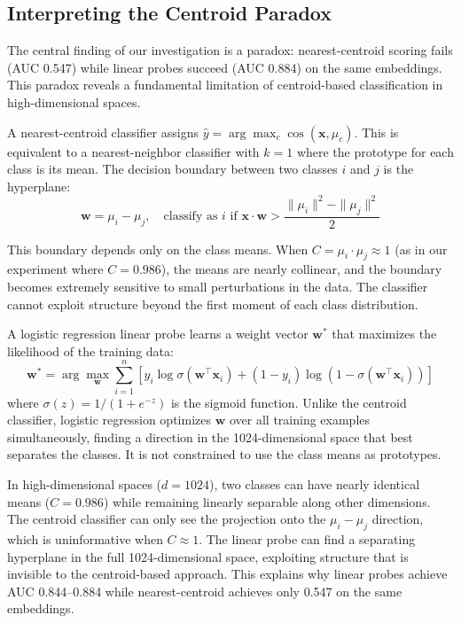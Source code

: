 \documentclass[12pt,a4paper]{article}
\begin{document}
\subsection{Interpreting the Centroid Paradox}\label{sec:paradox}

The central finding of our investigation is a paradox: nearest-centroid scoring fails (AUC 0.547) while linear probes succeed (AUC 0.884) on the same embeddings. This paradox reveals a fundamental limitation of centroid-based classification in high-dimensional spaces.

A nearest-centroid classifier assigns $\hat{y} = \arg\max_c \cos(\mathbf{x}, \mu_c)$. This is equivalent to a nearest-neighbor classifier with $k=1$ where the prototype for each class is its mean. The decision boundary between two classes $i$ and $j$ is the hyperplane:
\begin{equation}
\mathbf{w} = \mu_i - \mu_j, \quad \text{classify as } i \text{ if } \mathbf{x} \cdot \mathbf{w} > \frac{\|\mu_i\|^2 - \|\mu_j\|^2}{2}
\label{eq:centroid_boundary}
\end{equation}

This boundary depends only on the class means. When $C = \mu_i \cdot \mu_j \approx 1$ (as in our experiment where $C = 0.986$), the means are nearly collinear, and the boundary becomes extremely sensitive to small perturbations in the data. The classifier cannot exploit structure beyond the first moment of each class distribution.

A logistic regression linear probe learns a weight vector $\mathbf{w}^*$ that maximizes the likelihood of the training data:
\begin{equation}
\mathbf{w}^* = \arg\max_{\mathbf{w}} \sum_{i=1}^{n} \left[ y_i \log \sigma(\mathbf{w}^\top \mathbf{x}_i) + (1-y_i) \log(1 - \sigma(\mathbf{w}^\top \mathbf{x}_i)) \right]
\label{eq:logreg}
\end{equation}
where $\sigma(z) = 1/(1+e^{-z})$ is the sigmoid function. Unlike the centroid classifier, logistic regression optimizes $\mathbf{w}$ over all training examples simultaneously, finding a direction in the 1024-dimensional space that best separates the classes. It is not constrained to use the class means as prototypes.

In high-dimensional spaces ($d = 1024$), two classes can have nearly identical means ($C = 0.986$) while remaining linearly separable along other dimensions. The centroid classifier can only see the projection onto the $\mu_i - \mu_j$ direction, which is uninformative when $C \approx 1$. The linear probe can find a separating hyperplane in the full 1024-dimensional space, exploiting structure that is invisible to the centroid-based approach. This explains why linear probes achieve AUC 0.844--0.884 while nearest-centroid achieves only 0.547 on the same embeddings.
\end{document}
